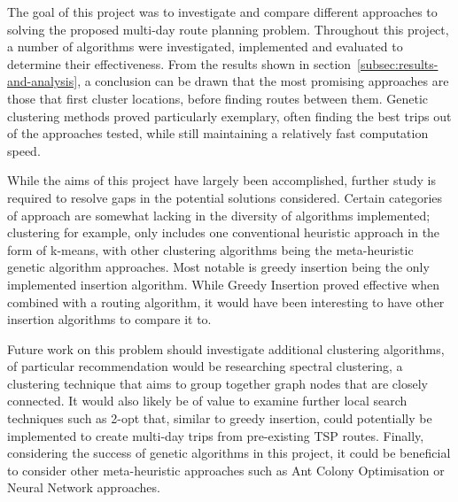 The goal of this project was to investigate and compare different approaches to solving the proposed multi-day route
planning problem.
Throughout this project, a number of algorithms were investigated, implemented and evaluated to determine their
effectiveness.
From the results shown in section~\ref{subsec:results-and-analysis}, a conclusion can be drawn that the most
promising approaches are those that first cluster locations, before finding routes between them.
Genetic clustering methods proved particularly exemplary, often finding the best trips out of the approaches
tested, while still maintaining a relatively fast computation speed.

While the aims of this project have largely been accomplished, further study is required to resolve gaps in the
potential solutions considered.
Certain categories of approach are somewhat lacking in the diversity of algorithms implemented; clustering for
example, only includes one conventional heuristic approach in the form of k-means, with other clustering algorithms
being the meta-heuristic genetic algorithm approaches.
Most notable is greedy insertion being the only implemented insertion algorithm.
While Greedy Insertion proved effective when combined with a routing algorithm, it would have been interesting to
have other insertion algorithms to compare it to.

Future work on this problem should investigate additional clustering algorithms, of particular
recommendation would be researching spectral clustering, a clustering technique that aims to group together graph
nodes that are closely connected.
It would also likely be of value to examine further local search techniques such as 2-opt that, similar to greedy
insertion, could potentially be implemented to create multi-day trips from pre-existing TSP routes.
Finally, considering the success of genetic algorithms in this project, it could be beneficial to consider other
meta-heuristic approaches such as Ant Colony Optimisation or Neural Network approaches.